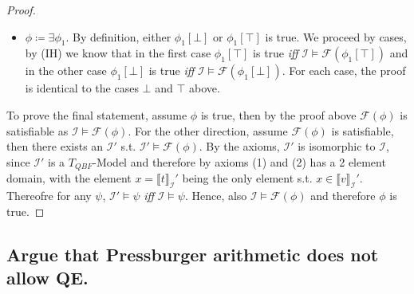 \begin{proof}
\begin{itemize}
      \paragraph{case $\top$:} Since $\mathcal{I} \models \top \iff v(t)$, we know $\mathcal{I} \models \mathcal{F}(\phi_1[v(t)])$ \emph{iff} $\mathcal{I} \models \mathcal{F}(\phi_1[\top])$ (\emph{Replacement theorem} would require another (trivial) proof by induction on formula). Moreover, $\mathcal{I} \models \mathcal{F}(\phi_1[v(t)]) \iff \mathcal{I}_{x \gets 1} \models \mathcal{F}(\phi_1[v(x)])$ and $\phi_1[v(x)] = \phi_1$. By transitivity of $\iff$, $\phi_1[\top]$ is true \emph{iff} $\mathcal{I}_{x \gets 1} \models \mathcal{F}(\phi_1)$.
      \paragraph{case $\bot$:} Symmetric to \textbf{case $\top$}.
    \item $\phi \coloneqq \exists \phi_1$. By definition, either $\phi_1[\bot]$ or $\phi_1[\top]$ is true.
      We proceed by cases, by (IH) we know that in the first case $\phi_1[\top]$ is true \emph{iff} $\mathcal{I} \models \mathcal{F}(\phi_1[\top])$ and in the other case $\phi_1[\bot]$ is true \emph{iff} $\mathcal{I} \models \mathcal{F}(\phi_1[\bot])$. For each case, the proof is identical to the cases $\bot$ and $\top$ above.
  \end{itemize}

  To prove the final statement, assume $\phi$ is true, then by the proof above $\mathcal{F}(\phi)$ is satisfiable as $\mathcal{I} \models \mathcal{F}(\phi)$. For the other direction, assume $\mathcal{F}(\phi)$ is satisfiable, then there exists an $\mathcal{I}'$ s.t. $\mathcal{I}' \models \mathcal{F}(\phi)$. By the axioms, $\mathcal{I}'$ is isomorphic to $\mathcal{I}$, since $\mathcal{I}'$ is a $T_{QBF}$-Model and therefore by axioms (1) and (2) has a 2 element domain, with the element $x = \llbracket t \rrbracket_\mathcal{I}'$ being the only element s.t. $x \in \llbracket v\rrbracket_\mathcal{I}'$. Thereofre for any $\psi$, $\mathcal{I}' \models \psi$ \emph{iff} $\mathcal{I} \models \psi$. Hence, also $\mathcal{I} \models \mathcal{F}(\phi)$ and therefore $\phi$ is true.
\end{proof}


\subsection{Argue that Pressburger arithmetic does not allow QE.}

